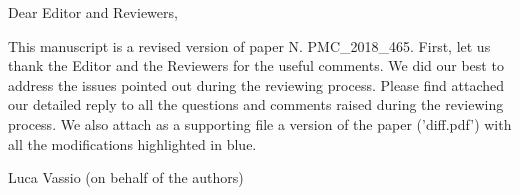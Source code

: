 \documentclass{letter}
\begin{document}
Dear Editor and Reviewers, 

This manuscript is a revised version of paper N. PMC\_2018\_465.
First, let us thank the Editor and the Reviewers for the useful comments.
We did our best to address the issues pointed out during the reviewing process. 
Please find attached our detailed reply to all the questions and comments raised during the reviewing process. We also attach as a supporting file a version of the paper ('diff.pdf') with all  the modifications highlighted in blue. 

Luca Vassio (on behalf of the authors)
\end{document}
